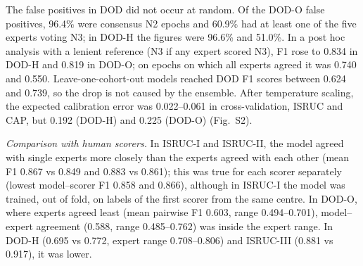 
The false positives in DOD did not occur at random. Of the DOD-O false positives, 96.4\% were consensus N2 epochs and 60.9\% had at least one of the five experts voting N3; in DOD-H the figures were 96.6\% and 51.0\%. In a post hoc analysis with a lenient reference (N3 if any expert scored N3), F1 rose to 0.834 in DOD-H and 0.819 in DOD-O; on epochs on which all experts agreed it was 0.740 and 0.550. Leave-one-cohort-out models reached DOD F1 scores between 0.624 and 0.739, so the drop is not caused by the ensemble. After temperature scaling, the expected calibration error was 0.022--0.061 in cross-validation, ISRUC and CAP, but 0.192 (DOD-H) and 0.225 (DOD-O) (Fig.~S2). %

\textit{Comparison with human scorers.} In ISRUC-I and ISRUC-II, the model agreed with single experts more closely than the experts agreed with each other (mean F1 0.867 vs 0.849 and 0.883 vs 0.861); this was true for each scorer separately (lowest model--scorer F1 0.858 and 0.866), although in ISRUC-I the model was trained, out of fold, on labels of the first scorer from the same centre. In DOD-O, where experts agreed least (mean pairwise F1 0.603, range 0.494--0.701), model--expert agreement (0.588, range 0.485--0.762) was inside the expert range. In DOD-H (0.695 vs 0.772, expert range 0.708--0.806) and ISRUC-III (0.881 vs 0.917), it was lower. %


